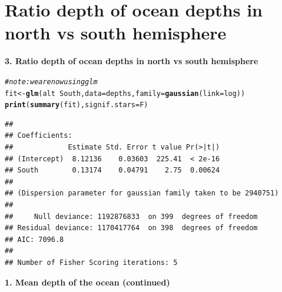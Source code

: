 \documentclass[10pt]{beamer}\usepackage[]{graphicx}\usepackage[]{color}
\makeatletter
\newcommand{\hlcom}[1]{\textcolor[rgb]{0.678,0.584,0.686}{\textit{#1}}}%
\newcommand{\hlopt}[1]{\textcolor[rgb]{0,0,0}{#1}}%
\newcommand{\hlstd}[1]{\textcolor[rgb]{0.345,0.345,0.345}{#1}}%
\newcommand{\hlkwb}[1]{\textcolor[rgb]{0.69,0.353,0.396}{#1}}%
\newcommand{\hlkwc}[1]{\textcolor[rgb]{0.333,0.667,0.333}{#1}}%
\newcommand{\hlkwd}[1]{\textcolor[rgb]{0.737,0.353,0.396}{\textbf{#1}}}%
\newenvironment{kframe}{%
 \def\at@end@of@kframe{}%
 \ifinner\ifhmode%
  \def\at@end@of@kframe{\end{minipage}}%
  \begin{minipage}{\columnwidth}%
 \fi\fi%
 \def\FrameCommand##1{\hskip\@totalleftmargin \hskip-\fboxsep
 \colorbox{shadecolor}{##1}\hskip-\fboxsep
     \hskip-\linewidth \hskip-\@totalleftmargin \hskip\columnwidth}%
 \MakeFramed {\advance\hsize-\width
   \@totalleftmargin\z@ \linewidth\hsize
   \@setminipage}}%
 {\par\unskip\endMakeFramed%
 \at@end@of@kframe}
\newenvironment{knitrout}{}{} %
\makeatother
\begin{document}
\section{Ratio depth of ocean depths in north vs south hemisphere}

\begin{frame}
\vspace*{-1.1in}
\textbf{3. Ratio depth of ocean depths in north vs south hemisphere}
\begin{knitrout}\tiny
{}\color{fgcolor}\begin{kframe}
\begin{alltt}
\hlcom{# note: we are now using glm}
\hlstd{fit} \hlkwb{<-} \hlkwd{glm}\hlstd{(alt} \hlopt{~} \hlstd{South,} \hlkwc{data} \hlstd{= depths,} \hlkwc{family} \hlstd{=} \hlkwd{gaussian}\hlstd{(}\hlkwc{link}\hlstd{=log))}
\hlkwd{print}\hlstd{(}\hlkwd{summary}\hlstd{(fit),} \hlkwc{signif.stars} \hlstd{= F)}
\end{alltt}
\begin{verbatim}
## 
## Coefficients:
##             Estimate Std. Error t value Pr(>|t|)
## (Intercept)  8.12136    0.03603  225.41  < 2e-16
## South        0.13174    0.04791    2.75  0.00624
## 
## (Dispersion parameter for gaussian family taken to be 2940751)
## 
##     Null deviance: 1192876833  on 399  degrees of freedom
## Residual deviance: 1170417764  on 398  degrees of freedom
## AIC: 7096.8
## 
## Number of Fisher Scoring iterations: 5
\end{verbatim}
\end{kframe}
\end{knitrout}

\end{frame}


\begin{frame}
	\vspace*{-5.0in}
	\textbf{1. Mean depth of the ocean (continued)}
	
\end{frame}
\end{document}
